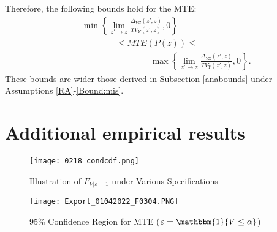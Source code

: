 \documentclass[11pt,reqno]{amsart}
\theoremstyle{plain}
\numberwithin{equation}{section}
\begin{document}
Therefore, the following bounds hold for the MTE:
\begin{eqnarray}
&& \min\left\{\lim_{z' \rightarrow z} \frac{\Delta_{YZ}(z',z)}{TV_{Y}(z',z)}, 0 \right\} \nonumber \\
&& \qquad \qquad \leq MTE(P(z))\leq \\
&& \qquad \qquad \qquad \qquad \max\left\{\lim_{z' \rightarrow z} \frac{\Delta_{YZ}(z',z)}{TV_{Y}(z',z)},  0\right\}. \nonumber
\end{eqnarray}
These bounds are wider those derived in Subsection \ref{anabounds} under Assumptions \ref{RA}-\ref{Bound:mis}.

\clearpage
\section{Additional empirical results}\label{apx:sup}
\begin{figure}[h]
    \begin{minipage}{\textwidth}
    \texttt{[image: 0218\_condcdf.png]}
    \centering
    \caption{Illustration of $F_{V | \varepsilon = 1 }$ under Various Specifications}
    \label{fig.condcdf}
    \end{minipage}
\end{figure}

\begin{figure}[h]
    \begin{minipage}{\textwidth}
    \texttt{[image: Export\_01042022\_F0304.PNG]}
    \centering
    \caption{95\% Confidence Region for MTE ($\varepsilon = \mathbbm{1} \{ V \leq \alpha \}$)}
    \label{fig.f0304}
    \end{minipage}
\end{figure}
\end{document}
